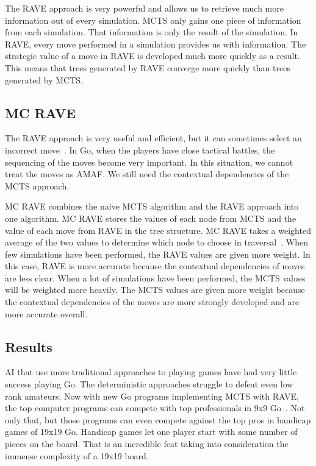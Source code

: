 \documentclass{sig-alternate}
\begin{document}
The RAVE approach is very powerful and allows us to retrieve much more information out of every simulation. MCTS only gains one piece of information from each simulation. That information is only the result of the simulation. In RAVE, every move performed in a simulation provides us with information. The strategic value of a move in RAVE is developed much more quickly as a result. This means that trees generated by RAVE converge more quickly than trees generated by MCTS.

\subsection{MC RAVE}
The RAVE approach is very useful and efficient, but it can sometimes select an incorrect move~\cite{RAVEinGo}. In Go, when the players have close tactical battles, the sequencing of the moves become very important. In this situation, we cannot treat the moves as AMAF. We still need the contextual dependencies of the MCTS approach.

MC RAVE combines the naive MCTS algorithm and the RAVE approach into one algorithm. MC RAVE stores the values of each node from MCTS and the value of each move from RAVE in the tree structure. MC RAVE takes a weighted average of the two values to determine which node to choose in traversal~\cite{RAVEinGo}. When few simulations have been performed, the RAVE values are given more weight. In this case, RAVE is more accurate because the contextual dependencies of moves are less clear. When a lot of simulations have been performed, the MCTS values will be weighted more heavily. The MCTS values are given more weight because the contextual dependencies of the moves are more strongly developed and are more accurate overall.
\subsection{Results}
AI that use more traditional approaches to playing games have had very little success playing Go. The deterministic approaches struggle to defeat even low rank amateurs. Now with new Go programs implementing MCTS with RAVE, the top computer programs can compete with top professionals in 9x9 Go~\cite{RAVEinGo}. Not only that, but those programs can even compete against the top pros in handicap games of 19x19 Go. Handicap games let one player start with some number of pieces on the board. That is an incredible feat taking into consideration the immense complexity of a 19x19 board.
\end{document}

